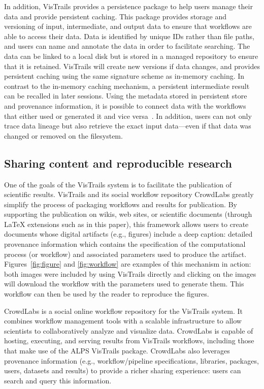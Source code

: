 \documentclass[12pt]{iopart}
\newcommand{\eg}{e.g.,\xspace}
\begin{document}
In addition, VisTrails provides a persistence package to help users
manage their data and provide persistent caching. This package
provides storage and versioning of input, intermediate, and output
data to ensure that workflows are able to access their data. Data is
identified by unique IDs rather than file paths, and users can name
and annotate the data in order to facilitate searching. The data can
be linked to a local disk but is stored in a managed repository to
ensure that it is retained. VisTrails will create new versions if
data changes, and provides persistent caching using the same signature
scheme as in-memory caching. In contrast to the in-memory caching
mechanism, a persistent intermediate result can be recalled in later
sessions. Using the metadata stored in persistent store and
provenance information, it is possible to connect data with the
workflows that either used or generated it and vice
versa~\cite{koop@ssdbm2010}. In addition, users can not only trace
data lineage but also retrieve the exact input data---even if that
data was changed or removed on the filesystem.


\subsection{Sharing content and reproducible research}

One of the goals of the VisTrails system is to
facilitate the publication of scientific results. VisTrails and its social workflow repository
CrowdLabs greatly simplify the process of packaging workflows and
results for publication. By supporting the publication on wikis, 
web sites, or scientific documents (through LaTeX extensions such as in this paper), this framework allows users to create
documents whose digital artifacts (\eg figures) include a deep
caption: detailed provenance information which contains the
specification of the computational process (or workflow) and
associated parameters used to produce the
artifact. Figures~\ref{fig:figure} and \ref{fig:workflow} are examples
of this mechanism in action: both images were included by using
VisTrails directly and clicking on the images will download the
workflow with the parameters used to generate them. This workflow can then be used by the reader to reproduce the figures.

CrowdLabs is a social online workflow repository for the VisTrails
system. It combines workflow management tools with a scalable
infrastructure to allow scientists to collaboratively analyze and
visualize data. CrowdLabs is capable of hosting, executing, and
serving results from VisTrails workflows, including those that make
use of the ALPS VisTrails package. CrowdLabs also leverages provenance
information (\eg workflow/pipeline specifications, libraries,
packages, users, datasets and results) to provide a richer sharing
experience: users can search and query this information.
\end{document}
